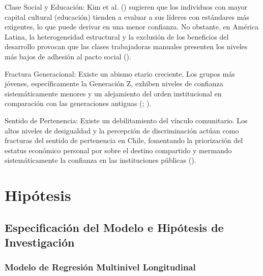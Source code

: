 \documentclass[
  spanish,
  a4paper,
  oneside]{scrbook}
\begin{document}
Clase Social y Educación: Kim et al. () sugieren que los individuos con mayor capital cultural
(educación) tienden a evaluar a sus líderes con estándares más
exigentes, lo que puede derivar en una menor confianza. No obstante, en
América Latina, la heterogeneidad estructural y la exclusión de los
beneficios del desarrollo provocan que las clases trabajadoras manuales
presenten los niveles más bajos de adhesión al pacto social
().

Fractura Generacional: Existe un abismo etario creciente. Los grupos más
jóvenes, específicamente la Generación Z, exhiben niveles de confianza
sistemáticamente menores y un alejamiento del orden institucional en
comparación con las generaciones antiguas
(; ).

Sentido de Pertenencia: Existe un debilitamiento del vínculo
comunitario. Los altos niveles de desigualdad y la percepción de
discriminación actúan como fracturas del sentido de pertenencia en
Chile, fomentando la priorización del estatus económico personal por
sobre el destino compartido y mermando sistemáticamente la confianza en
las instituciones públicas ().


\chapter{Hipótesis}\label{hipuxf3tesis}

\section{Especificación del Modelo e Hipótesis de
Investigación}\label{especificaciuxf3n-del-modelo-e-hipuxf3tesis-de-investigaciuxf3n}

\subsection{Modelo de Regresión Multinivel
Longitudinal}\label{modelo-de-regresiuxf3n-multinivel-longitudinal}
\end{document}
